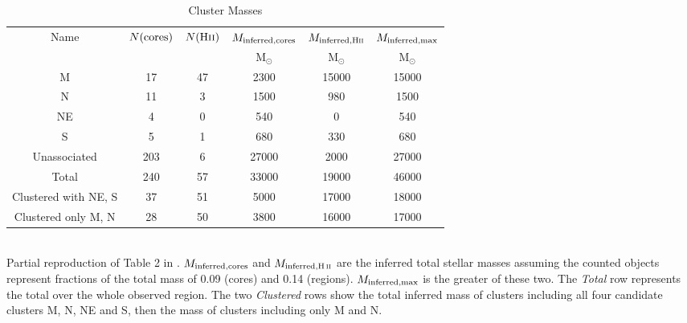\begin{table*}[htp]
\centering
\begin{minipage}{130mm}
\caption{Cluster Masses}
\begin{tabular}{cccccc}
\label{tab:clustermassestimates}
Name & $N({\rm cores})$ & $N({\rm H\textsc{ii}})$ & $M_{\rm inferred, cores}$ & $M_{\rm inferred, H\textsc{ii}}$ & $M_{\rm inferred,max}$ \\
 &  &  & $\mathrm{M_{\odot}}$ & $\mathrm{M_{\odot}}$ & $\mathrm{M_{\odot}}$ \\
\hline
M & 17 & 47 & 2300 & 15000 & 15000 \\
N & 11 & 3 & 1500 & 980 & 1500 \\
NE & 4 & 0 & 540 & 0 & 540 \\
S & 5 & 1 & 680 & 330 & 680 \\
Unassociated & 203 & 6 & 27000 & 2000 & 27000 \\
Total & 240 & 57 & 33000 & 19000 & 46000 \\
Clustered with NE, S & 37 & 51 & 5000 & 17000 & 18000 \\
Clustered only M, N & 28 & 50 & 3800 & 16000 & 17000 \\
\hline
\end{tabular}
\\
Partial reproduction of Table 2 in \citet{Ginsburg2018a}. $M_{\rm inferred,cores}$ and $M_{\rm inferred,\hii}$ are the inferred total stellar masses assuming the counted objects represent fractions of the total mass of 0.09 (cores) and 0.14 (\hii regions).  $M_{\rm inferred,max}$ is the greater of these two.  The \emph{Total} row represents the total over the whole observed region.  The two \emph{Clustered} rows show the total inferred mass of clusters including all four candidate clusters M, N, NE and S, then the mass of clusters including only M and N.
\end{minipage}
\end{table*}

